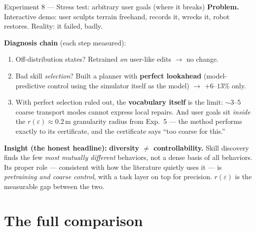 \documentclass[aspectratio=169,11pt]{beamer}
\newcommand{\bad}[1]{\textcolor{badred}{#1}}
\begin{document}
\begin{frame}{Experiment 8 --- Stress test: arbitrary user goals (where it breaks)}
\textbf{Problem.} Interactive demo: user sculpts terrain freehand, records it, wrecks it, robot restores. Reality: \bad{it failed, badly.}

\textbf{Diagnosis chain} (each step measured):
\begin{enumerate}
  \item Off-distribution states? Retrained \emph{on} user-like edits $\to$ \bad{no change}.
  \item Bad skill \emph{selection}? Built a planner with \textbf{perfect lookahead} (model-predictive control using the simulator itself as the model) $\to$ \bad{$+6$--$13\%$ only}.
  \item[$\Rightarrow$] With perfect selection ruled out, the \textbf{vocabulary itself} is the limit: $\sim$3--5 coarse transport modes cannot express local repairs. And user goals sit \emph{inside} the $r(\varepsilon)\!\approx\!0.2$\,m granularity radius from Exp.\ 5 --- the method performs exactly to its certificate, and the certificate says ``too coarse for this.''
\end{enumerate}

\textbf{Insight (the honest headline):} \textbf{diversity $\neq$ controllability.} Skill discovery finds the few \emph{most mutually different} behaviors, not a dense basis of all behaviors. Its proper role --- consistent with how the literature quietly uses it --- is \emph{pretraining and coarse control}, with a task layer on top for precision. $r(\varepsilon)$ is the measurable gap between the two.
\end{frame}

\section{The full comparison}
\end{document}
